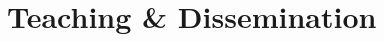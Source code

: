 \documentclass[11pt, a4paper]{awesome-cv}
\begin{document}

\newpage
\hypertarget{teaching-dissemination}{\section{Teaching \& Dissemination}\label{teaching-dissemination}}
%
%
\end{document}
